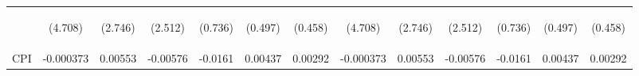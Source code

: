 \documentclass[]{article}
\begin{document}
\begin{center}
\begin{tabular}{lcccccccccccc}
\vspace{4pt} & \begin{footnotesize}(4.708)\end{footnotesize} & \begin{footnotesize}(2.746)\end{footnotesize} & \begin{footnotesize}(2.512)\end{footnotesize} & \begin{footnotesize}(0.736)\end{footnotesize} & \begin{footnotesize}(0.497)\end{footnotesize} & \begin{footnotesize}(0.458)\end{footnotesize} & \begin{footnotesize}(4.708)\end{footnotesize} & \begin{footnotesize}(2.746)\end{footnotesize} & \begin{footnotesize}(2.512)\end{footnotesize} & \begin{footnotesize}(0.736)\end{footnotesize} & \begin{footnotesize}(0.497)\end{footnotesize} & \begin{footnotesize}(0.458)\end{footnotesize} \\
CPI & -0.000373 & 0.00553 & -0.00576 & -0.0161 & 0.00437 & 0.00292 & -0.000373 & 0.00553 & -0.00576 & -0.0161 & 0.00437 & 0.00292 \\

\end{tabular}
\end{center}
\end{document}
